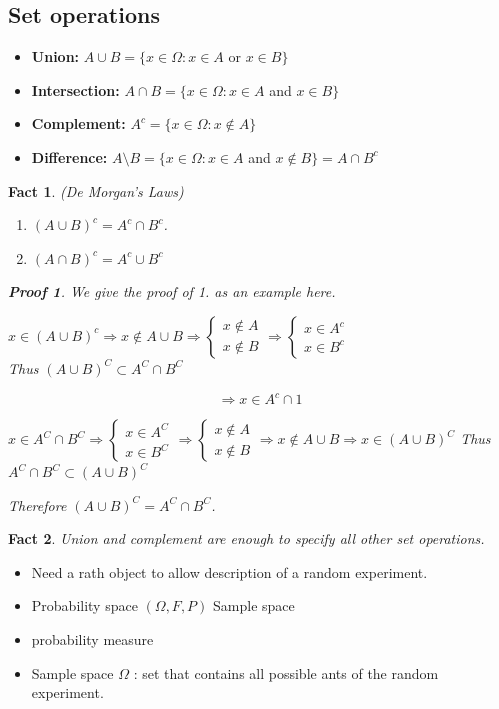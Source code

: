 \subsection{Set operations}
\begin{itemize}
  \item \textbf{Union:} \(A \cup B=\{x \in \Omega: x \in A\) or \(x \in B\}\)
  \item \textbf{Intersection:} \(A \cap B=\{x \in \Omega: x \in A\) and \(x \in B\}\)
  \item \textbf{Complement:} \(A^{c}=\{x \in \Omega: x \notin A\}\)
  \item \textbf{Difference:} \(A \setminus B=\{x \in \Omega: x \in A\) and \(x \notin B\}=A \cap B^{c}\)
\end{itemize}

\newtheorem{fact}{Fact}
\newtheorem{proof*}{Proof}

\begin{fact}(De Morgan's Laws)
\begin{enumerate}
\item \((A \cup B)^{c}=A^{c} \cap B^{c}\).
\item \((A \cap B)^{c}=A^{c} \cup B^{c}\)
\end{enumerate}
\begin{proof*}
We give the proof of 1. as an example here.

\(x \in(A \cup B)^{c} \Rightarrow x \notin A \cup B \Rightarrow\left\{\begin{array}{l}x \notin A \\ x \notin B\end{array} \Rightarrow\left\{\begin{array}{l}x \in A^{c} \\ x \in B^{c}\end{array}\right.\right.\)\\
Thus \((A \cup B)^{C} \subset A^{C} \cap B^{C}\)

\[
\Rightarrow x \in A^{c} \cap 1
\]

\(x \in A^{C} \cap B^{C} \Rightarrow\left\{\begin{array}{l}x \in A^{C} \\ x \in B^{C}\end{array} \Rightarrow\left\{\begin{array}{l}x \notin A \\ x \notin B\end{array} \Rightarrow x \notin A \cup B \Rightarrow x \in(A \cup B)^{C}\right.\right.\) Thus \(A^{C} \cap B^{C} \subset(A \cup B)^{C}\)

Therefore \((A \cup B)^{C}=A^{C} \cap B^{C}\).
\end{proof*}
\end{fact}
\begin{fact}
Union and complement are enough to specify all other set operations.
\end{fact}



\begin{itemize}
  \item[-] Need a rath object to allow description of a random experiment.
  \item[-] Probability space \((\Omega, F, P)\) Sample space
  \item[] probability measure
  \item[-] Sample space \(\Omega\) : set that contains all possible ants of the random experiment.
\end{itemize}
